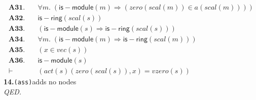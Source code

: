 \documentclass[11pt]{article}
\begin{document}
\begin{align*}
  \mathbf{A31.}\quad & \forall m.\; (\mathsf{is{-}module}(m) \Rightarrow (\mathit{zero}(\mathit{scal}(m)) \in a(\mathit{scal}(m)))) \\
  \mathbf{A32.}\quad & \mathsf{is{-}ring}(\mathit{scal}(s)) \\
  \mathbf{A33.}\quad & (\mathsf{is{-}module}(s) \Rightarrow \mathsf{is{-}ring}(\mathit{scal}(s))) \\
  \mathbf{A34.}\quad & \forall m.\; (\mathsf{is{-}module}(m) \Rightarrow \mathsf{is{-}ring}(\mathit{scal}(m))) \\
  \mathbf{A35.}\quad & (x \in \mathit{vec}(s)) \\
  \mathbf{A36.}\quad & \mathsf{is{-}module}(s) \\
  \vdash\quad & (\mathit{act}(s)(\mathit{zero}(\mathit{scal}(s)), x) = \mathit{vzero}(s))
\end{align*}
\medskip\noindent\textbf{14.}\quad \texttt{(ass)}\hfill{\small adds no nodes}\\[2pt]
\emph{QED.}\par
\end{document}
